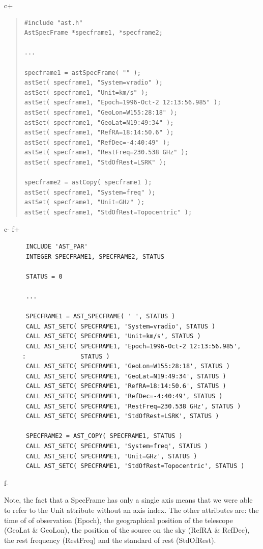 \documentclass[twoside,11pt]{article}
\begin{document}
c+
\begin{quote}
\small
\begin{verbatim}
#include "ast.h"
AstSpecFrame *specframe1, *specframe2;

...

specframe1 = astSpecFrame( "" );
astSet( specframe1, "System=vradio" );
astSet( specframe1, "Unit=km/s" );
astSet( specframe1, "Epoch=1996-Oct-2 12:13:56.985" );
astSet( specframe1, "GeoLon=W155:28:18" );
astSet( specframe1, "GeoLat=N19:49:34" );
astSet( specframe1, "RefRA=18:14:50.6" );
astSet( specframe1, "RefDec=-4:40:49" );
astSet( specframe1, "RestFreq=230.538 GHz" );
astSet( specframe1, "StdOfRest=LSRK" );

specframe2 = astCopy( specframe1 );
astSet( specframe1, "System=freq" );
astSet( specframe1, "Unit=GHz" );
astSet( specframe1, "StdOfRest=Topocentric" );

\end{verbatim}
\normalsize
\end{quote}
c-
f+
\small
\begin{verbatim}
      INCLUDE 'AST_PAR'
      INTEGER SPECFRAME1, SPECFRAME2, STATUS

      STATUS = 0

      ...

      SPECFRAME1 = AST_SPECFRAME( ' ', STATUS )
      CALL AST_SETC( SPECFRAME1, 'System=vradio', STATUS )
      CALL AST_SETC( SPECFRAME1, 'Unit=km/s', STATUS )
      CALL AST_SETC( SPECFRAME1, 'Epoch=1996-Oct-2 12:13:56.985', 
     :               STATUS )
      CALL AST_SETC( SPECFRAME1, 'GeoLon=W155:28:18', STATUS )
      CALL AST_SETC( SPECFRAME1, 'GeoLat=N19:49:34', STATUS )
      CALL AST_SETC( SPECFRAME1, 'RefRA=18:14:50.6', STATUS )
      CALL AST_SETC( SPECFRAME1, 'RefDec=-4:40:49', STATUS )
      CALL AST_SETC( SPECFRAME1, 'RestFreq=230.538 GHz', STATUS )
      CALL AST_SETC( SPECFRAME1, 'StdOfRest=LSRK', STATUS )
      
      SPECFRAME2 = AST_COPY( SPECFRAME1, STATUS )
      CALL AST_SETC( SPECFRAME1, 'System=freq', STATUS )
      CALL AST_SETC( SPECFRAME1, 'Unit=GHz', STATUS )
      CALL AST_SETC( SPECFRAME1, 'StdOfRest=Topocentric', STATUS )

\end{verbatim}
\normalsize
f-

Note, the fact that a SpecFrame has only a single axis means that we were
able to refer to the Unit attribute without an axis index. The other
attributes are: the time of of observation (Epoch), the geographical
position of the telescope (GeoLat \& GeoLon), the position of the source
on the sky (RefRA \& RefDec), the rest frequency (RestFreq) and the
standard of rest (StdOfRest).
\end{document}
